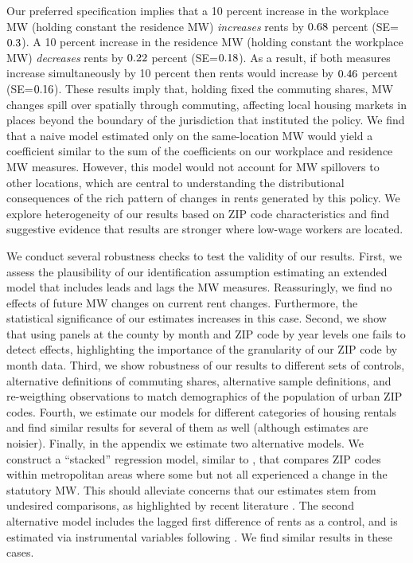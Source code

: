 
Our preferred specification implies that 
a 10 percent increase in the workplace MW (holding constant the residence MW) 
\textit{increases} rents by $\textnormal{0.68}$ percent 
(SE=$\textnormal{0.3}$).
A 10 percent increase in the residence MW (holding constant the workplace MW) 
\textit{decreases} rents by $\textnormal{0.22}$ percent 
(SE=$\textnormal{0.18}$). 
As a result, if both measures increase simultaneously by 10 percent then 
rents would increase by $\textnormal{0.46}$ percent 
(SE=$\textnormal{0.16}$).
These results imply that, holding fixed the commuting shares, MW 
changes spill over spatially through commuting, affecting local housing markets 
in places beyond the boundary of the jurisdiction that instituted the policy.
We find that a naive model estimated only on the same-location MW would yield a 
coefficient similar to the sum of the coefficients on our workplace and 
residence MW measures.
However, this model would not account for MW spillovers to other locations, 
which are central to understanding the distributional consequences of the rich 
pattern of changes in rents generated by this policy.
We explore heterogeneity of our results based on ZIP code characteristics and
find suggestive evidence that results are stronger where low-wage workers are 
located.


We conduct several robustness checks to test the validity of our results.
First, we assess the plausibility of our identification assumption estimating 
an extended model that includes leads and lags the MW measures.
Reassuringly, we find no effects of future MW changes on current rent changes.
Furthermore, the statistical significance of our estimates increases in 
this case.
Second, we show that using panels at the county by month and ZIP code by year 
levels one fails to detect effects, highlighting the importance of the 
granularity of our ZIP code by month data.
Third, we show robustness of our results to different sets of controls,
alternative definitions of commuting shares, alternative sample definitions,
and re-weigthing observations to match demographics of the population of
urban ZIP codes.
Fourth, we estimate our models for different categories of housing rentals and
find similar results for several of them as well (although estimates are noisier).
Finally, in the appendix we estimate two alternative models.
We construct a ``stacked'' regression model, similar to \textcite{CegnizEtAl2019},
that compares ZIP codes within metropolitan areas where some but not all 
experienced a change in the statutory MW.
This should alleviate concerns that our estimates stem from undesired 
comparisons, as highlighted by recent literature 
\parencite{deChaisemartinEtAl2022,RothEtAl2022}.
The second alternative model includes the lagged first difference of rents as 
a control, and is estimated via instrumental variables following 
\textcite{ArellanoBond1991}.
We find similar results in these cases.

